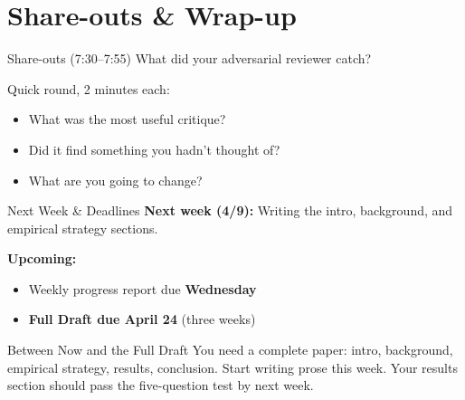 \section{Share-outs \& Wrap-up}

\begin{frame}{Share-outs (7:30--7:55)}
  What did your adversarial reviewer catch?

  \vspace{6pt}

  Quick round, 2 minutes each:
  \begin{itemize}
    \item What was the most useful critique?
    \item Did it find something you hadn't thought of?
    \item What are you going to change?
  \end{itemize}
\end{frame}

\begin{frame}{Next Week \& Deadlines}
  \textbf{Next week (4/9):} Writing the intro, background, and empirical strategy sections.

  \vspace{10pt}

  \textbf{Upcoming:}
  \begin{itemize}
    \item Weekly progress report due \textbf{Wednesday}
    \item \textbf{\textcolor{usfgreen}{Full Draft due April 24}} (three weeks)
  \end{itemize}

  \vspace{10pt}

  \begin{block}{Between Now and the Full Draft}
    You need a complete paper: intro, background, empirical strategy, results, conclusion. Start writing prose this week. Your results section should pass the five-question test by next week.
  \end{block}
\end{frame}


